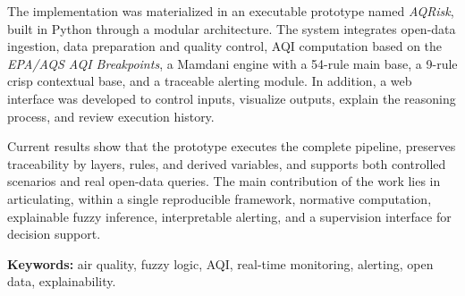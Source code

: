 The implementation was materialized in an executable prototype named \textit{AQRisk}, built in Python through a modular architecture. The system integrates open-data ingestion, data preparation and quality control, AQI computation based on the \textit{EPA/AQS AQI Breakpoints}, a Mamdani engine with a 54-rule main base, a 9-rule crisp contextual base, and a traceable alerting module. In addition, a web interface was developed to control inputs, visualize outputs, explain the reasoning process, and review execution history.

Current results show that the prototype executes the complete pipeline, preserves traceability by layers, rules, and derived variables, and supports both controlled scenarios and real open-data queries. The main contribution of the work lies in articulating, within a single reproducible framework, normative computation, explainable fuzzy inference, interpretable alerting, and a supervision interface for decision support.

\textbf{Keywords:} air quality, fuzzy logic, AQI, real-time monitoring, alerting, open data, explainability.
